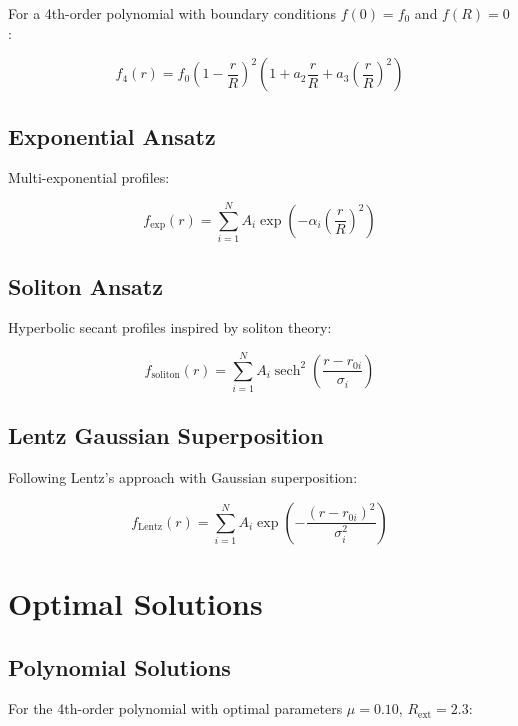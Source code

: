 \documentclass[12pt,a4paper]{article}
\begin{document}
For a 4th-order polynomial with boundary conditions $f(0) = f_0$ and $f(R) = 0$:

\begin{equation}
f_4(r) = f_0 \left(1 - \frac{r}{R}\right)^2 \left(1 + a_2 \frac{r}{R} + a_3 \left(\frac{r}{R}\right)^2\right)
\end{equation}

\subsection{Exponential Ansatz}

Multi-exponential profiles:

\begin{equation}
f_{\text{exp}}(r) = \sum_{i=1}^N A_i \exp\left(-\alpha_i \left(\frac{r}{R}\right)^2\right)
\end{equation}

\subsection{Soliton Ansatz}

Hyperbolic secant profiles inspired by soliton theory:

\begin{equation}
f_{\text{soliton}}(r) = \sum_{i=1}^N A_i \operatorname{sech}^2\left(\frac{r - r_{0i}}{\sigma_i}\right)
\end{equation}

\subsection{Lentz Gaussian Superposition}

Following Lentz's approach with Gaussian superposition:

\begin{equation}
f_{\text{Lentz}}(r) = \sum_{i=1}^N A_i \exp\left(-\frac{(r - r_{0i})^2}{\sigma_i^2}\right)
\end{equation}

\section{Optimal Solutions}

\subsection{Polynomial Solutions}

For the 4th-order polynomial with optimal parameters $\mu = 0.10$, $R_{\text{ext}} = 2.3$:
\end{document}
